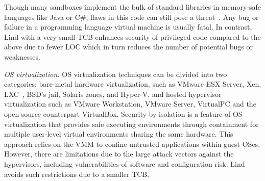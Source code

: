 
Though many sandboxes implement the bulk of standard libraries in
memory-safe languages like Java or C\#, flaws in this code can
still pose a threat~\cite{JavaBugs, Java-Lessons}. 
Any bug or failure in a programming language virtual
machine is usually fatal. In contrast, Lind with a very small TCB
enhances security of privileged code compared to the above due to fewer LOC which in turn reduces the number of potential bugs or weaknesses. %


\textit{OS virtualization.}
OS virtualization techniques can be divided into two categories:
bare-metal hardware virtualization, such as VMware ESX Server, Xen,
LXC~\cite{LXC}, BSD's jail, Solaris zones, and Hyper-V, and
hosted hypervisor virtualization such as VMware
Workstation, VMware Server, VirtualPC and the open-source counterpart
VirtualBox.
%
Security by isolation \cite{Qubes, Overshadow, SecureVM, HypSec} is a feature of OS virtualization that
provides safe executing environments through containment for multiple
user-level virtual environments sharing the same hardware. This
approach relies on the VMM to confine untrusted applications within
guest OSes. However, there are limitations due to
the large attack vectors against the hypervisors, including
vulnerabilities of software and configuration risk. Lind avoids such restrictions due to a smaller TCB.

